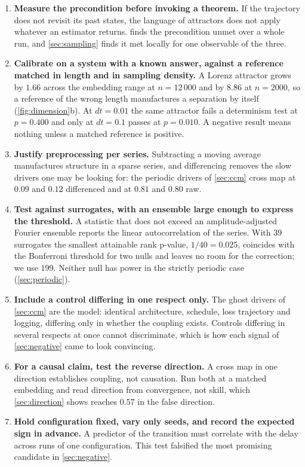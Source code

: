 \documentclass{article}
\begin{document}
\begin{enumerate}
\item \textbf{Measure the precondition before invoking a theorem.} If the trajectory does
not revisit its past states, the language of attractors does not apply whatever an
estimator returns.  finds the precondition unmet over a whole run,
and \cref{sec:sampling} finds it met locally for one observable of the three.

\item \textbf{Calibrate on a system with a known answer, against a reference matched in
length and in sampling density.} A Lorenz attractor grows by $1.66$ across the embedding
range at $n = 12\,000$ and by $8.86$ at $n = 2000$, so a reference of the wrong length
manufactures a separation by itself (\cref{fig:dimension}b). At $dt = 0.01$ the same
attractor fails a determinism test at $p = 0.400$ and only at $dt = 0.1$ passes at
$p = 0.010$. A negative result means nothing unless a matched reference is positive.

\item \textbf{Justify preprocessing per series.} Subtracting a moving average manufactures
structure in a sparse series, and differencing removes the slow drivers one may be looking
for: the periodic drivers of \cref{sec:ccm} cross map at $0.09$ and $0.12$ differenced and
at $0.81$ and $0.80$ raw.

\item \textbf{Test against surrogates, with an ensemble large enough to express the
threshold.} A statistic that does not exceed an amplitude-adjusted Fourier ensemble reports
the linear autocorrelation of the series. With $39$ surrogates the smallest attainable rank
p-value, $1/40 = 0.025$, coincides with the Bonferroni threshold for two nulls and leaves
no room for the correction; we use $199$. Neither null has power in the strictly periodic
case (\cref{sec:periodic}).

\item \textbf{Include a control differing in one respect only.} The ghost drivers of
\cref{sec:ccm} are the model: identical architecture, schedule, loss trajectory and
logging, differing only in whether the coupling exists. Controls differing in several
respects at once cannot discriminate, which is how each signal of \cref{sec:negative} came
to look convincing.

\item \textbf{For a causal claim, test the reverse direction.} A cross map in one direction
establishes coupling, not causation. Run both at a matched embedding and read direction
from convergence, not skill, which \cref{sec:direction} shows reaches $0.57$ in the false
direction.

\item \textbf{Hold configuration fixed, vary only seeds, and record the expected sign in
advance.} A predictor of the transition must correlate with the delay across runs of one
configuration. This test falsified the most promising candidate in \cref{sec:negative}.
\end{enumerate}
\end{document}
